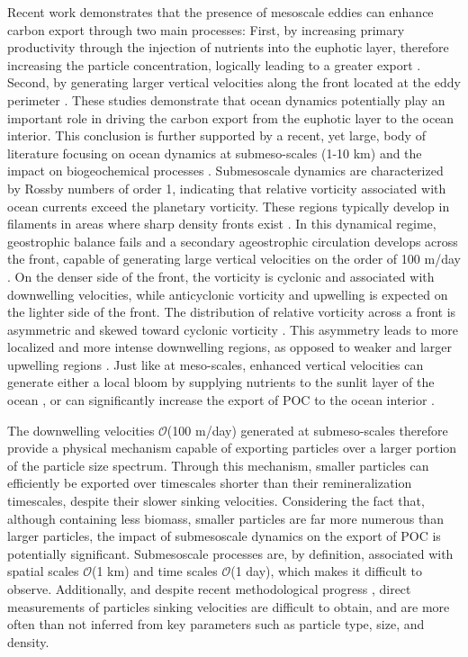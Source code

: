 \documentclass[draft,linenumbers]{agujournal2018}
\begin{document}
Recent work demonstrates that the presence of mesoscale eddies can enhance carbon export through two main processes: First, by increasing primary productivity through the injection of nutrients into the euphotic layer, therefore increasing the particle concentration, logically leading to a greater export \citep{Levy_1998}. Second, by generating larger vertical velocities along the front located at the eddy perimeter \citep{vanHaren_2006, Waite_2016}. These studies demonstrate that ocean dynamics potentially play an important role in driving the carbon export from the euphotic layer to the ocean interior. This conclusion is further supported by a recent, yet large, body of literature focusing on ocean dynamics at submeso-scales (1-10 km) and the impact on biogeochemical processes \citep[see reviews in][]{Thomas_2008,Klein_2009,Mahadevan_2016}. Submesoscale dynamics are characterized by Rossby numbers of order 1, indicating that relative vorticity associated with ocean currents exceed the planetary vorticity. These regions typically develop in filaments in areas where sharp density fronts exist \citep{McWilliams_2016}. In this dynamical regime, geostrophic balance fails and a secondary ageostrophic circulation develops across the front, capable of generating large vertical velocities on the order of 100 m/day \citep{FoxKemper_2008,Mahadevan_2016}. On the denser side of the front, the vorticity is cyclonic and associated with downwelling velocities, while anticyclonic vorticity and upwelling is expected on the lighter side of the front. The distribution of relative vorticity across a front is asymmetric and skewed toward cyclonic vorticity \citep{Rudnick_2001}. This asymmetry leads to more localized and more intense downwelling regions, as opposed to weaker and larger upwelling regions \citep{Mahadevan_2006}. Just like at meso-scales, enhanced vertical velocities can generate either a local bloom by supplying nutrients to the sunlit layer of the ocean \citep{Mahadevan_2012}, or can significantly increase the export of POC to the ocean interior \citep{Levy_2012, Estapa_2015,Omand_2015}. 

The downwelling velocities $\mathcal{O}$(100 m/day) generated at submeso-scales therefore provide a physical mechanism capable of exporting particles over a larger portion of the particle size spectrum. Through this mechanism, smaller particles can efficiently be exported over timescales shorter than their remineralization timescales, despite their slower sinking velocities. Considering the fact that, although containing less biomass, smaller particles are far more numerous than larger particles, the impact of submesoscale dynamics on the export of POC is potentially significant. Submesoscale processes are, by definition, associated with spatial scales $\mathcal{O}$(1 km) and time scales $\mathcal{O}$(1 day), which makes it difficult to observe. Additionally, and despite recent methodological progress \citep{McDonnell_2010}, direct measurements of particles sinking velocities are difficult to obtain, and are more often than not inferred from key parameters such as particle type, size, and density.
\end{document}
